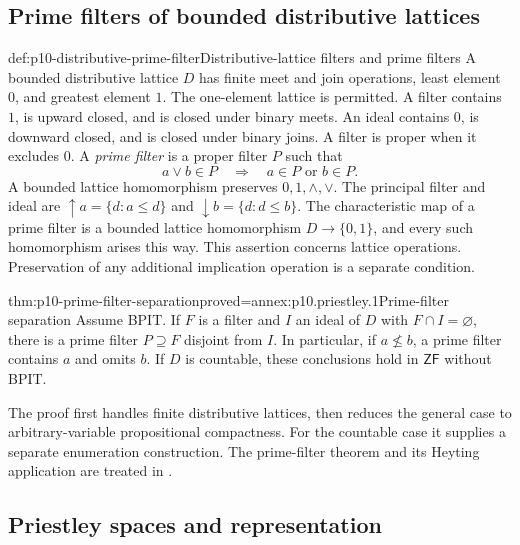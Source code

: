 
\subsection{Prime filters of bounded distributive lattices}
\label{sec:p10-prime-filters}

\begin{hbdefinition}{def:p10-distributive-prime-filter}{Distributive-lattice filters and prime filters}
A bounded distributive lattice \(D\) has finite meet and join
operations, least element \(0\), and greatest element \(1\).
The one-element lattice is permitted.
A filter contains \(1\), is upward closed, and is closed under
binary meets. An ideal contains \(0\), is downward closed, and
is closed under binary joins.
A filter is proper when it excludes \(0\).
A \emph{prime filter} is a proper filter \(P\) such that
\[
 a\vee b\in P\quad\Longrightarrow\quad a\in P\text{ or }b\in P.
\]
A bounded lattice homomorphism preserves \(0,1,\wedge,\vee\).
The principal filter and ideal are
\(\uparrow a=\{d:a\leq d\}\) and
\(\downarrow b=\{d:d\leq b\}\).
The characteristic map of a prime filter is a bounded lattice
homomorphism \(D\to\{0,1\}\), and every such homomorphism arises
this way. This assertion concerns lattice operations.
Preservation of any additional implication operation is a separate
condition.
\end{hbdefinition}

\begin{hbtheorem}{thm:p10-prime-filter-separation}{proved=annex:p10.priestley.1}{Prime-filter separation}
Assume BPIT. If \(F\) is a filter and \(I\) an ideal of \(D\)
with \(F\cap I=\varnothing\), there is a prime filter
\(P\supseteq F\) disjoint from \(I\).
In particular, if \(a\not\leq b\), a prime filter contains \(a\)
and omits \(b\).
If \(D\) is countable, these conclusions hold in \(\mathsf{ZF}\)
without BPIT.
\end{hbtheorem}

The proof first handles finite distributive lattices, then reduces
the general case to arbitrary-variable propositional compactness.
For the countable case it supplies a separate enumeration construction.
The prime-filter theorem and its Heyting application are treated in
\cite[Prime Filter Theorem and Corollary~2.14, p.~41;
Theorem~2.26, pp.~47--48]{Moraschini2023AlgebraLogicNotes}.

\subsection{Priestley spaces and representation}
\label{sec:p10-priestley-duality}

